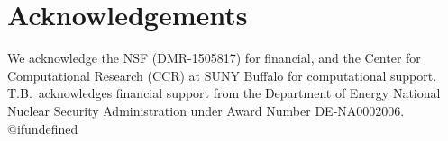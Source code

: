 \documentclass[12pt,letterpaper,oneside]{article}
\begin{document}
\section{Acknowledgements}
We acknowledge the NSF (DMR-1505817) for financial, and the Center for Computational Research (CCR) at SUNY Buffalo for computational support. T.B.\ acknowledges financial support from the Department of Energy National Nuclear Security Administration under Award Number DE-NA0002006. 
%
%
\pagebreak
%
\providecommand{\latin}[1]{#1}
\makeatletter
\providecommand{\doi}
  {\begingroup\let\do\@makeother\dospecials
  \catcode`\{=1 \catcode`\}=2 \doi@aux}
\providecommand{\doi@aux}[1]{\endgroup\texttt{#1}}
\makeatother
\providecommand*\mcitethebibliography{\thebibliography}
\csname @ifundefined
  {\let\endmcitethebibliography\endthebibliography}{}
\end{document}
